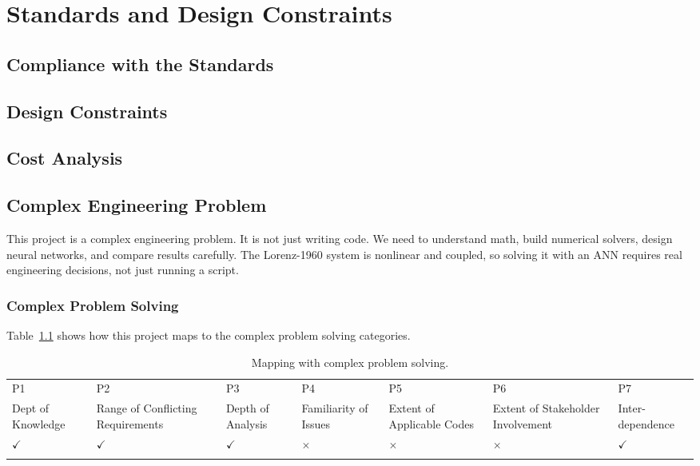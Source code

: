 \chapter{Standards and Design Constraints}


\section{Compliance with the Standards}



\section{Design Constraints}


\section{Cost Analysis}


\section{Complex Engineering Problem}

This project is a complex engineering problem. It is not just writing code. We need to understand math, build numerical solvers, design neural networks, and compare results carefully. The Lorenz-1960 system is nonlinear and coupled, so solving it with an ANN requires real engineering decisions, not just running a script.

\subsection{Complex Problem Solving}

Table~\ref{tab:p_solve} shows how this project maps to the complex problem solving categories.

\begin{center}
    \begin{table}[ht]
        \centering
        \caption{Mapping with complex problem solving.}
        \begin{tabular}{|p{}|p{}|p{}|p{}|p{}|p{}|p{}|}
        \hline
        P1& P2& P3& P4& P5& P6& P7\\
        Dept of Knowledge & Range of Conflicting Requirements & Depth of Analysis & Familiarity of Issues & Extent of Applicable Codes & Extent of Stakeholder Involvement & Inter-dependence\\
        \hline 
        $\checkmark$ & $\checkmark$ & $\checkmark$ & $\times$ & $\times$ & $\times$ & $\checkmark$\\
        &&&&&&\\
        \hline 
        \end{tabular}
        \label{tab:p_solve}
    \end{table}
\end{center}

